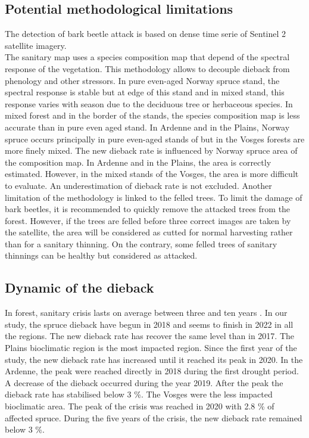 \documentclass[3p,procedia]{elsarticle}
\begin{document}
\subsection{Potential methodological limitations}
The detection of bark beetle attack is based on dense time serie of Sentinel 2 satellite imagery. \\
The sanitary map uses a species composition map that depend of the spectral response of the vegetation.
This methodology allows to decouple dieback from phenology and other stressors.
In pure even-aged Norway spruce stand, the spectral response is stable but at edge of this stand and in mixed stand, this response varies with season due to the deciduous tree or herbaceous species.
In mixed forest and in the border of the stands, the species composition map is less accurate than in pure even aged stand.
In Ardenne and in the Plains, Norway spruce occurs principally in pure even-aged stands of  but in the Vosges forests are more finely mixed.
The new dieback rate is influenced by Norway spruce area of the composition map.
In Ardenne and in the Plains, the area is correctly estimated.
However, in the mixed stands of the  Vosges, the area is more difficult to evaluate.
An underestimation of dieback rate is not excluded.
Another limitation of the methodology is linked to the felled trees.
To limit the damage of bark beetles, it is recommended to quickly remove the attacked trees from the forest.
However, if the trees are felled before three correct images are taken by the satellite, the area will be considered as cutted for normal harvesting  rather than for a sanitary thinning.
On the contrary, some felled trees of sanitary thinnings can be healthy but considered as attacked.   
 
\subsection{Dynamic of the dieback}
In forest, sanitary crisis lasts on average between three and ten years \citep{brunier_guide_2020}.
In our study, the spruce dieback have begun in 2018 and seems to finish in 2022 in all the regions.
The new dieback rate has recover the same level than in 2017.
The Plains bioclimatic region is the most impacted region.
Since the first year of the study, the new dieback rate has increased until it reached its peak in 2020.
In the Ardenne, the peak were reached directly in 2018 during the first drought period.
A decrease of the dieback occurred during the year 2019.
After the peak the dieback rate has stabilised below 3 \%.
The Vosges were the less impacted bioclimatic area. 
The peak of the crisis was reached in 2020 with 2.8 \% of affected spruce.
During the five years of the crisis, the new dieback rate remained below 3 \%.
\end{document}
